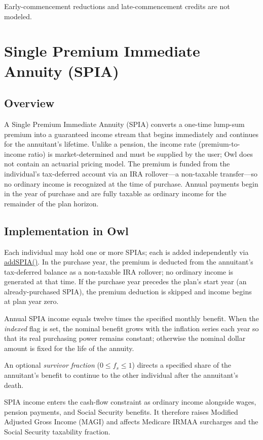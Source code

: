 \documentclass[fleqn,12pt]{report}
\newcommand{\code}[1]{\url{#1}}
\begin{document}
Early-commencement reductions and late-commencement credits are not modeled.

\section{Single Premium Immediate Annuity (SPIA)}
\label{sec:spia}

\subsection*{Overview}

A Single Premium Immediate Annuity (SPIA) converts a one-time lump-sum premium
into a guaranteed income stream that begins immediately and continues for the
annuitant's lifetime.
Unlike a pension, the income rate (premium-to-income ratio) is market-determined
and must be supplied by the user; Owl does not contain an actuarial pricing model.
The premium is funded from the individual's tax-deferred account via an IRA
rollover---a non-taxable transfer---so no ordinary income is recognized at the
time of purchase.
Annual payments begin in the year of purchase and are fully taxable as ordinary
income for the remainder of the plan horizon.

\subsection*{Implementation in Owl}

Each individual may hold one or more SPIAs; each is added independently via
\code{addSPIA()}.
In the purchase year, the premium is deducted from the annuitant's tax-deferred
balance as a non-taxable IRA rollover; no ordinary income is generated at that
time.
If the purchase year precedes the plan's start year (an already-purchased SPIA),
the premium deduction is skipped and income begins at plan year zero.

Annual SPIA income equals twelve times the specified monthly benefit.
When the \emph{indexed} flag is set, the nominal benefit grows with the inflation
series each year so that its real purchasing power remains constant; otherwise
the nominal dollar amount is fixed for the life of the annuity.

An optional \emph{survivor fraction} ($0 \le f_s \le 1$) directs a specified
share of the annuitant's benefit to continue to the other individual after the
annuitant's death.

SPIA income enters the cash-flow constraint as ordinary income alongside wages,
pension payments, and Social Security benefits.
It therefore raises Modified Adjusted Gross Income (MAGI) and affects Medicare
IRMAA surcharges and the Social Security taxability fraction.
\end{document}
